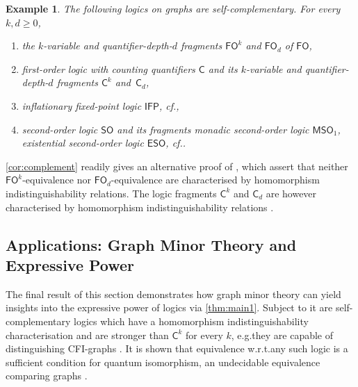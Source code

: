 \documentclass[3p,final]{elsarticle}
\newtheorem{example}[theorem]{Example}
\begin{document}
	\begin{example} \label{ex:logics} \label{ex:fo-fragment} \label{ex:counting}
		The following logics on graphs are self-complementary. For every $k, d \geq 0$,
		\begin{enumerate}
			\item the $k$-variable and quantifier-depth-$d$ fragments $\mathsf{FO}^k$ and $\mathsf{FO}_d$ of $\mathsf{FO}$,
			\item first-order logic with counting quantifiers $\mathsf{C}$ and its $k$-variable and quantifier-depth-$d$ fragments $\mathsf{C}^k$ and~$\mathsf{C}_d$,
			\item inflationary fixed-point logic $\mathsf{IFP}$, cf.\@ \cite{grohe_descriptive_2017},
			\item second-order logic $\mathsf{SO}$ and its fragments monadic second-order logic $\mathsf{MSO}_1$, existential second-order logic $\mathsf{ESO}$, cf.\@ \cite{courcelle_monadic_1994,blass_model_2010}.
		\end{enumerate}
	\end{example}
		\cref{cor:complement} readily gives an alternative proof of \cite[Propositions~1 and~2]{atserias_expressive_2021}, which assert that neither $\mathsf{FO}^k$-equivalence nor $\mathsf{FO}_d$-equivalence are characterised by homomorphism indistinguishability relations.
	The logic fragments $\mathsf{C}^k$ and $\mathsf{C}_d$ are however characterised by homomorphism indistinguishability relations \cite{dvorak_recognizing_2010,grohe_counting_2020}.
	




	




	

	\subsection{Applications: Graph Minor Theory and Expressive Power}


	The final result of this section demonstrates how graph minor theory can yield insights into the expressive power of logics via \cref{thm:main1}.
	Subject to it are self-complementary logics which have a homomorphism indistinguishability characterisation and are stronger than $\mathsf{C}^k$ for every $k$, e.g.\@ they are capable of distinguishing CFI-graphs \cite{cai_optimal_1992}.
	It is shown that equivalence w.r.t.\@ any such logic is a sufficient condition for quantum isomorphism, an undecidable equivalence comparing graphs \cite{atserias_quantum_2019}.
		
\end{document}
